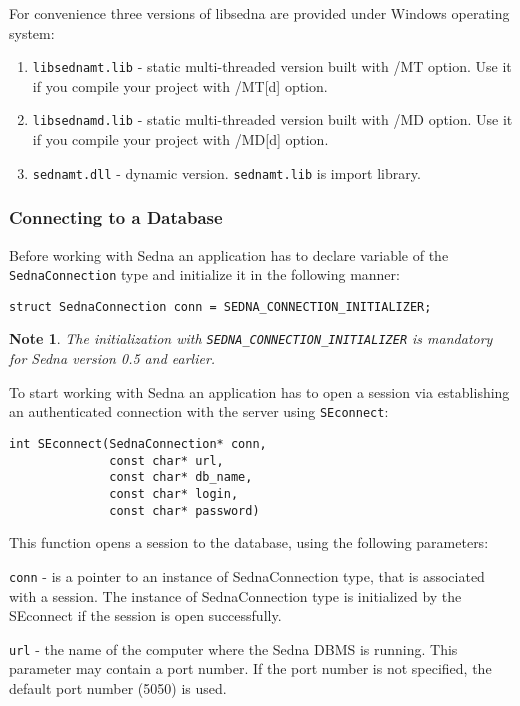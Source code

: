 \documentclass[a4paper,12pt]{article}
\newtheorem{note}{Note}
\begin{document}
For convenience three versions of libsedna are provided under Windows operating system:

\begin{enumerate}
\item\verb!libsednamt.lib! - static multi-threaded version built with /MT option. Use it if you compile your project with /MT[d] option.
\item\verb!libsednamd.lib! - static multi-threaded version built with /MD option. Use it if you compile your project with /MD[d] option.
\item\verb!sednamt.dll! - dynamic version. \verb!sednamt.lib! is import library.
\end{enumerate}


\subsubsection{Connecting to a Database}
Before working with Sedna an application has to declare variable of the \verb!SednaConnection! type and initialize it in the following manner:

\begin{verbatim}struct SednaConnection conn = SEDNA_CONNECTION_INITIALIZER;\end{verbatim}

\begin{note}
The initialization with \verb!SEDNA_CONNECTION_INITIALIZER! is mandatory for Sedna version 0.5 and earlier.
\end{note}
To start working with Sedna an application has to open a session via establishing an authenticated connection with the server using \verb!SEconnect!:
\begin{verbatim}
int SEconnect(SednaConnection* conn,
              const char* url,
              const char* db_name,
              const char* login,
              const char* password)
\end{verbatim}
This function opens a session to the database, using the following parameters:

\verb!conn! - is a pointer to an instance of SednaConnection type, that is associated with a session. The instance of SednaConnection type is initialized by the SEconnect if the session is open successfully.

\verb!url! - the name of the computer where the Sedna DBMS is running. This
parameter may contain a port number. If the port number is not specified, the
default port number (5050) is used.
\end{document}
